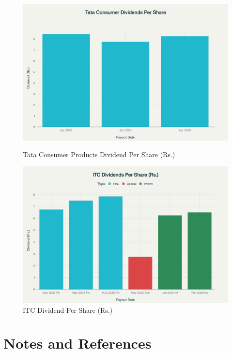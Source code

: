 \documentclass[12pt, a4paper]{report}
\begin{document}
\begin{figure}[H]
    \centering
    \begin{minipage}{0.48\textwidth}
        \centering
        \includegraphics[width=\textwidth]{assets/Dividend_Payout_Tata.png}
        \caption{Tata Consumer Products Dividend Per Share (Rs.)}
    \end{minipage}
    \hfill
    \begin{minipage}{0.48\textwidth}
        \centering
        \includegraphics[width=\textwidth]{assets/Dividend_Payout_ITC.png}
        \caption{ITC Dividend Per Share (Rs.)}
    \end{minipage}
\end{figure}

\newpage
\appendix
\chapter{Notes and References}
\end{document}
